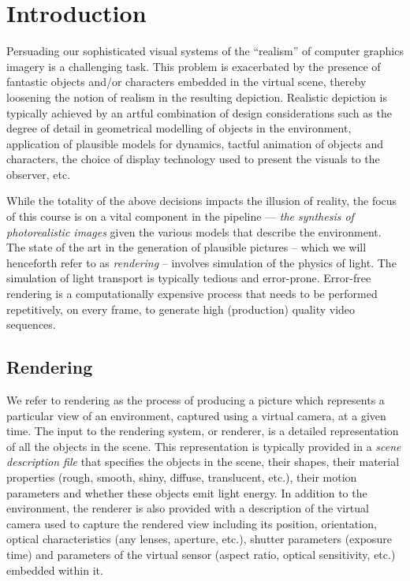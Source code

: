 \documentclass[11pt,fleqn]{book} %
\begin{document}
\chapter{Introduction}
Persuading our sophisticated visual systems of the ``realism'' of computer graphics imagery is a challenging task. 
This problem is exacerbated by the presence of fantastic objects and/or characters embedded in the virtual scene, thereby loosening the notion of realism in the resulting depiction. 
Realistic depiction is typically achieved by an artful combination of design considerations such as the degree of detail in geometrical modelling of objects in the environment, application of plausible models for dynamics, tactful animation of objects and characters, the choice of display technology used to present the visuals to the observer, etc. 

While the totality of the above decisions impacts the illusion of reality, the focus of this course is on a vital component in the pipeline --- \textit{the synthesis of photorealistic images} given the various models that describe the environment. The state of the art in the generation of plausible pictures -- which we will henceforth refer to as \textit{rendering} --  involves simulation of the physics of light. 
The simulation of light transport is typically tedious and error-prone.
Error-free rendering is a computationally expensive process that needs to be performed repetitively, on every frame, to generate high (production) quality video sequences. 


\section{Rendering}
We refer to rendering as the process of producing a picture which represents a particular view of an environment, captured using a virtual camera, at a given time. The input to the rendering system, or renderer, is a detailed representation of all the objects in the scene. This representation is typically provided in a \textit{scene description file} that specifies the objects in the scene, their shapes, their material properties (rough, smooth, shiny, diffuse, translucent, etc.), their motion parameters and whether these objects emit light energy. In addition to the environment, the renderer is also provided with a description of the virtual camera used to capture the rendered view including its position, orientation, optical characteristics (any lenses, aperture, etc.), shutter parameters (exposure time)  and parameters of the virtual sensor (aspect ratio, optical sensitivity, etc.) embedded within it. 
\end{document}
